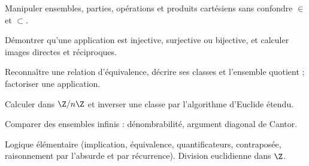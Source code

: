 \begin{objectifs}
\item Manipuler ensembles, parties, opérations et produits cartésiens sans confondre $\in$ et $\subset$.
\item Démontrer qu'une application est injective, surjective ou bijective, et calculer images directes et réciproques.
\item Reconnaître une relation d'équivalence, décrire ses classes et l'ensemble quotient ; factoriser une application.
\item Calculer dans $\Z/n\Z$ et inverser une classe par l'algorithme d'Euclide étendu.
\item Comparer des ensembles infinis : dénombrabilité, argument diagonal de Cantor.
\end{objectifs}
\begin{prerequis}
Logique élémentaire (implication, équivalence, quantificateurs, contraposée, raisonnement par l'absurde et par récurrence). Division euclidienne dans $\Z$.
\end{prerequis}

